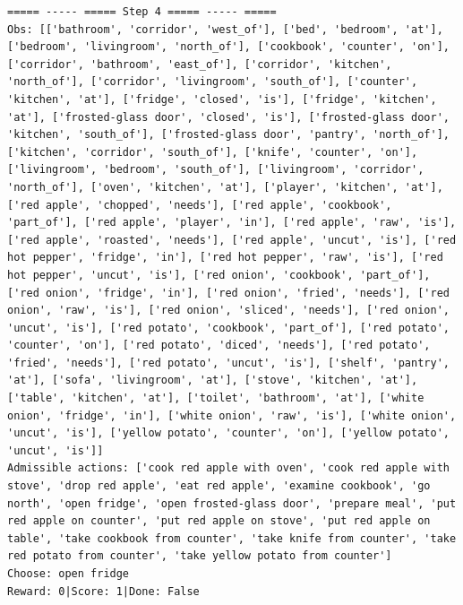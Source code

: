 \documentclass[11pt]{article}
\begin{document}
\begin{lstlisting}
===== ----- ===== Step 4 ===== ----- =====
Obs: [['bathroom', 'corridor', 'west_of'], ['bed', 'bedroom', 'at'], ['bedroom', 'livingroom', 'north_of'], ['cookbook', 'counter', 'on'], ['corridor', 'bathroom', 'east_of'], ['corridor', 'kitchen', 'north_of'], ['corridor', 'livingroom', 'south_of'], ['counter', 'kitchen', 'at'], ['fridge', 'closed', 'is'], ['fridge', 'kitchen', 'at'], ['frosted-glass door', 'closed', 'is'], ['frosted-glass door', 'kitchen', 'south_of'], ['frosted-glass door', 'pantry', 'north_of'], ['kitchen', 'corridor', 'south_of'], ['knife', 'counter', 'on'], ['livingroom', 'bedroom', 'south_of'], ['livingroom', 'corridor', 'north_of'], ['oven', 'kitchen', 'at'], ['player', 'kitchen', 'at'], ['red apple', 'chopped', 'needs'], ['red apple', 'cookbook', 'part_of'], ['red apple', 'player', 'in'], ['red apple', 'raw', 'is'], ['red apple', 'roasted', 'needs'], ['red apple', 'uncut', 'is'], ['red hot pepper', 'fridge', 'in'], ['red hot pepper', 'raw', 'is'], ['red hot pepper', 'uncut', 'is'], ['red onion', 'cookbook', 'part_of'], ['red onion', 'fridge', 'in'], ['red onion', 'fried', 'needs'], ['red onion', 'raw', 'is'], ['red onion', 'sliced', 'needs'], ['red onion', 'uncut', 'is'], ['red potato', 'cookbook', 'part_of'], ['red potato', 'counter', 'on'], ['red potato', 'diced', 'needs'], ['red potato', 'fried', 'needs'], ['red potato', 'uncut', 'is'], ['shelf', 'pantry', 'at'], ['sofa', 'livingroom', 'at'], ['stove', 'kitchen', 'at'], ['table', 'kitchen', 'at'], ['toilet', 'bathroom', 'at'], ['white onion', 'fridge', 'in'], ['white onion', 'raw', 'is'], ['white onion', 'uncut', 'is'], ['yellow potato', 'counter', 'on'], ['yellow potato', 'uncut', 'is']]
Admissible actions: ['cook red apple with oven', 'cook red apple with stove', 'drop red apple', 'eat red apple', 'examine cookbook', 'go north', 'open fridge', 'open frosted-glass door', 'prepare meal', 'put red apple on counter', 'put red apple on stove', 'put red apple on table', 'take cookbook from counter', 'take knife from counter', 'take red potato from counter', 'take yellow potato from counter']
Choose: open fridge
Reward: 0|Score: 1|Done: False


\end{lstlisting}
\end{document}
